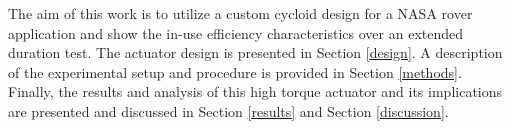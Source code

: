 The aim of this work is to utilize a custom cycloid design for a NASA rover application and show the in-use efficiency characteristics over an extended duration test. The actuator design is presented in Section \ref{design}. A description of the experimental setup and procedure is provided in Section \ref{methods}. Finally, the results and analysis of this high torque actuator and its implications are presented and discussed in Section \ref{results} and Section \ref{discussion}. 